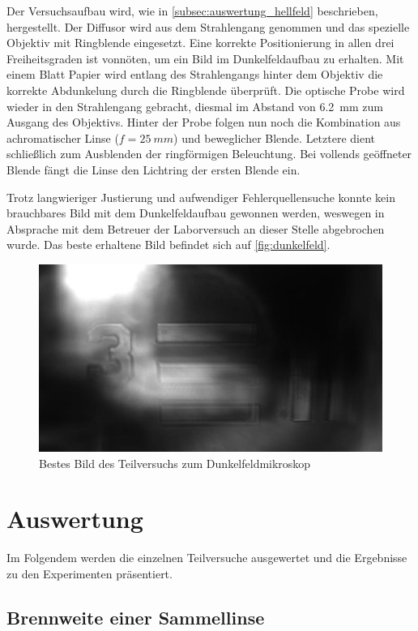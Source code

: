 \documentclass[english, ngerman]{scrartcl}
\begin{document}
Der Versuchsaufbau wird, wie in \autoref{subsec:auswertung_hellfeld} beschrieben, hergestellt. Der Diffusor wird aus dem Strahlengang genommen und das spezielle Objektiv mit Ringblende eingesetzt. Eine korrekte Positionierung in allen drei Freiheitsgraden ist vonnöten, um ein Bild im Dunkelfeldaufbau zu erhalten. Mit einem Blatt Papier wird entlang des Strahlengangs hinter dem Objektiv die korrekte Abdunkelung durch die Ringblende überprüft. Die optische Probe wird wieder in den Strahlengang gebracht, diesmal im Abstand von \SI{6.2}{mm} zum Ausgang des Objektivs. Hinter der Probe folgen nun noch die Kombination aus achromatischer Linse
($f = \SI{25}{mm}$) und beweglicher Blende. Letztere dient schließlich zum Ausblenden der ringförmigen Beleuchtung. Bei vollends geöffneter Blende fängt die Linse den Lichtring der ersten Blende ein.

Trotz langwieriger Justierung und aufwendiger Fehlerquellensuche konnte kein brauchbares Bild mit dem Dunkelfeldaufbau gewonnen werden, weswegen in Absprache mit dem Betreuer der Laborversuch an dieser Stelle abgebrochen wurde. Das beste erhaltene Bild befindet sich auf \autoref{fig:dunkelfeld}.
%
\begin{figure}[H]
    \centering
    \begin{samepage}
        \includegraphics[width=0.6\linewidth]{fig/Versuch4/dunkelfeld_test3.jpg}
        \caption[Dunkelfeld]{Bestes Bild des Teilversuchs zum Dunkelfeldmikroskop}
        \label{fig:dunkelfeld}
    \end{samepage}
\end{figure}


\newpage
\section{Auswertung}
\label{sec:auswertung}

Im Folgendem werden die einzelnen Teilversuche ausgewertet und die Ergebnisse zu den Experimenten präsentiert.

\subsection{Brennweite einer Sammellinse}
\label{subsec:auswertung_sammellinse}
\end{document}
